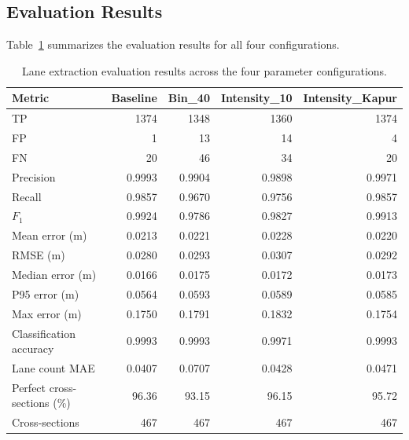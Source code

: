 \FloatBarrier
\subsection{Evaluation Results}
\label{sec:eval_lanes_results}

Table~\ref{tab:lane_eval} summarizes the evaluation results for all four configurations.

\begin{table}[htbp]
  \centering
  \caption{Lane extraction evaluation results across the four parameter configurations.}
  \label{tab:lane_eval}
  \small
  \begin{tabular}{@{}lrrrr@{}}
    \hline
    Metric & Baseline & Bin\_40 & Intensity\_10 & Intensity\_Kapur \\
    \hline
    TP                            & 1374   & 1348   & 1360   & 1374   \\
    FP                            & 1      & 13     & 14     & 4      \\
    FN                            & 20     & 46     & 34     & 20     \\
    Precision                     & 0.9993 & 0.9904 & 0.9898 & 0.9971 \\
    Recall                        & 0.9857 & 0.9670 & 0.9756 & 0.9857 \\
    $F_1$                         & 0.9924 & 0.9786 & 0.9827 & 0.9913 \\
    \hline
    Mean error (m)                & 0.0213 & 0.0221 & 0.0228 & 0.0220 \\
    RMSE (m)                      & 0.0280 & 0.0293 & 0.0307 & 0.0292 \\
    Median error (m)              & 0.0166 & 0.0175 & 0.0172 & 0.0173 \\
    P95 error (m)                 & 0.0564 & 0.0593 & 0.0589 & 0.0585 \\
    Max error (m)                 & 0.1750 & 0.1791 & 0.1832 & 0.1754 \\
    \hline
    Classification accuracy       & 0.9993 & 0.9993 & 0.9971 & 0.9993 \\
    Lane count MAE                & 0.0407 & 0.0707 & 0.0428 & 0.0471 \\
    Perfect cross-sections (\%)   & 96.36  & 93.15  & 96.15  & 95.72  \\
    Cross-sections                & 467    & 467    & 467    & 467    \\
    \hline
  \end{tabular}
\end{table}

